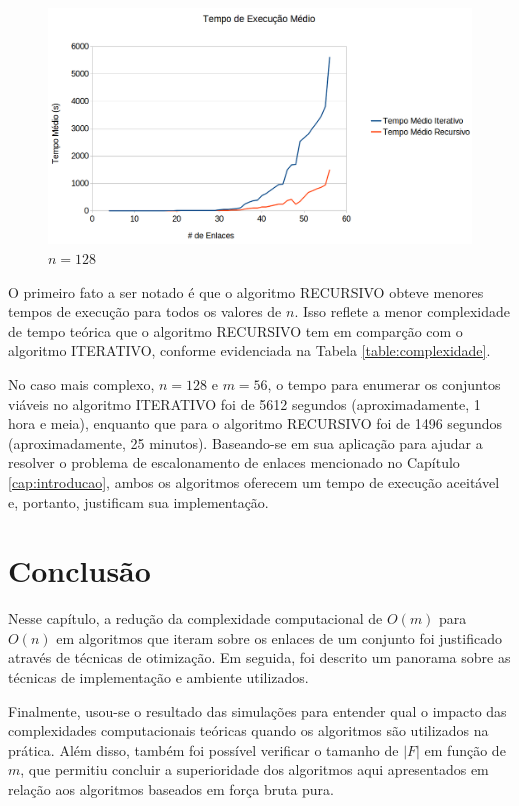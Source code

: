 \begin{figure}[ht]
\begin{minipage}[b]{0.5\linewidth}
    \caption{$n=64$} 
    \vspace{4ex}
  \end{minipage}%
  \begin{minipage}[b]{0.5\linewidth}
    \centering
    \includegraphics[width=1\linewidth]{figs/tempo128.png} 
    \caption{$n=128$} 
    \vspace{4ex}
  \end{minipage} 
\end{figure}


O primeiro fato a ser notado é que o algoritmo RECURSIVO obteve menores tempos de execução para todos os valores de $n$. Isso reflete a menor complexidade de tempo teórica que o algoritmo RECURSIVO tem em comparção com o algoritmo ITERATIVO, conforme evidenciada na Tabela \ref{table:complexidade}. 

No caso mais complexo, $n=128$ e $m=56$, o tempo para enumerar os conjuntos viáveis no algoritmo ITERATIVO foi de 5612 segundos (aproximadamente, 1 hora e meia), enquanto que para o algoritmo RECURSIVO foi de 1496 segundos (aproximadamente, 25 minutos). Baseando-se em sua aplicação para ajudar a resolver o problema de escalonamento de enlaces mencionado no Capítulo \ref{cap:introducao}, ambos os algoritmos oferecem um tempo de execução aceitável e, portanto, justificam sua implementação.

\section{Conclusão}

Nesse capítulo, a redução da complexidade computacional de $O(m)$ para $O(n)$ em algoritmos que iteram sobre os enlaces de um conjunto foi justificado através de técnicas de otimização. Em seguida, foi descrito um panorama sobre as técnicas de implementação e ambiente utilizados. 

Finalmente, usou-se o resultado das simulações para entender qual o impacto das complexidades computacionais teóricas quando os algoritmos são utilizados na prática. Além disso, também foi possível verificar o tamanho de $|F|$ em função de $m$, que permitiu concluir a superioridade dos algoritmos aqui apresentados em relação aos algoritmos baseados em força bruta pura.

